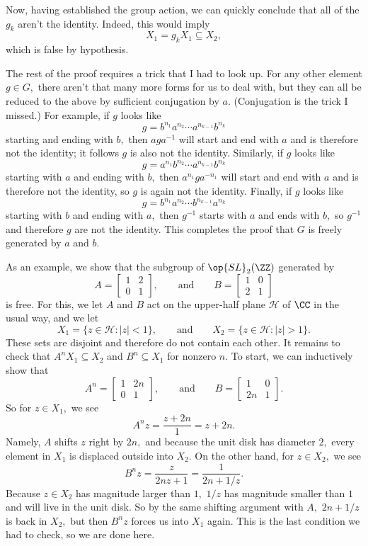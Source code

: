 Now, having established the group action, we can quickly conclude that all of the $g_k$ aren't the identity. Indeed, this would imply
\[X_1=g_kX_1\subseteq X_2,\]
which is false by hypothesis.

The rest of the proof requires a trick that I had to look up. For any other element $g\in G,$ there aren't that many more forms for us to deal with, but they can all be reduced to the above by sufficient conjugation by $a.$ (Conjugation is the trick I missed.) For example, if $g$ looks like
\[g=b^{n_1}a^{n_2}\cdots a^{n_{k-1}}b^{n_k}\]
starting and ending with $b,$ then $aga^{-1}$ will start and end with $a$ and is therefore not the identity; it follows $g$ is also not the identity. Similarly, if $g$ looks like
\[g=a^{n_1}b^{n_2}\cdots a^{n_{k-1}}b^{n_k}\]
starting with $a$ and ending with $b,$ then $a^{n_1}ga^{-n_1}$ will start and end with $a$ and is therefore not the identity, so $g$ is again not the identity. Finally, if $g$ looks like
\[g=b^{n_1}a^{n_2}\cdots b^{n_{k-1}}a^{n_k}\]
starting with $b$ and ending with $a,$ then $g^{-1}$ starts with $a$ and ends with $b,$ so $g^{-1}$ and therefore $g$ are not the identity. This completes the proof that $G$ is freely generated by $a$ and $b.$

As an example, we show that the subgroup of $\op{SL}_2(\ZZ)$ generated by
\[A=\begin{bmatrix}1&2\\0&1\end{bmatrix},\qquad\text{and}\qquad B=\begin{bmatrix}1&0\\2&1\end{bmatrix}\]
is free. For this, we let $A$ and $B$ act on the upper-half plane $\mathcal H$ of $\CC$ in the usual way, and we let
\[X_1=\{z\in\mathcal H:|z|<1\},\qquad\text{and}\qquad X_2=\{z\in\mathcal H:|z|>1\}.\]
These sets are disjoint and therefore do not contain each other. It remains to check that $A^nX_1\subseteq X_2$ and $B^n\subseteq X_1$ for nonzero $n.$ To start, we can inductively show that
\[A^n=\begin{bmatrix}1&2n\\0&1\end{bmatrix},\qquad\text{and}\qquad B=\begin{bmatrix}1&0\\2n&1\end{bmatrix}.\]
So for $z\in X_1,$ we see
\[A^nz=\frac{z+2n}1=z+2n.\]
Namely, $A$ shifts $z$ right by $2n,$ and because the unit disk has diameter $2,$ every element in $X_1$ is displaced outside into $X_2.$ On the other hand, for $z\in X_2,$ we see
\[B^nz=\frac z{2nz+1}=\frac1{2n+1/z}.\]
Because $z\in X_2$ has magnitude larger than $1,$ $1/z$ has magnitude smaller than $1$ and will live in the unit disk. So by the same shifting argument with $A,$ $2n+1/z$ is back in $X_2,$ but then $B^nz$ forces us into $X_1$ again. This is the last condition we had to check, so we are done here.

